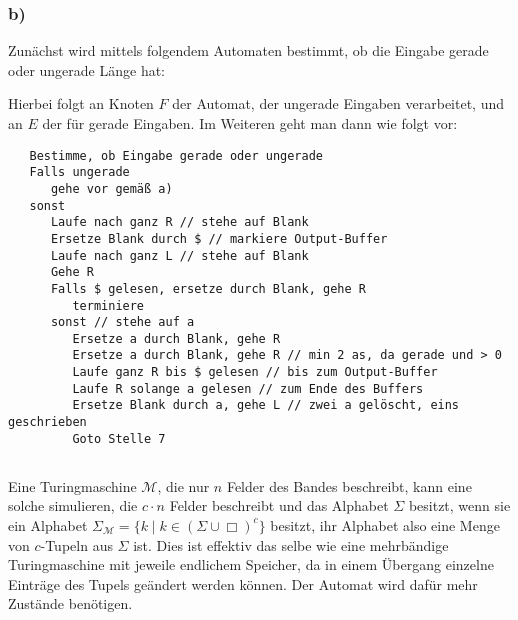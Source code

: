 \documentclass{article}
\begin{document}
\subsubsection{b)}

Zunächst wird mittels folgendem Automaten bestimmt, ob die Eingabe gerade oder
ungerade Länge hat:

\begin{center}
\end{center}

Hierbei folgt an Knoten $F$ der Automat, der ungerade Eingaben verarbeitet, und
an $E$ der für gerade Eingaben. Im Weiteren geht man dann wie folgt vor:

\begin{lstlisting}
   Bestimme, ob Eingabe gerade oder ungerade
   Falls ungerade
      gehe vor gemäß a)
   sonst
      Laufe nach ganz R // stehe auf Blank
      Ersetze Blank durch $ // markiere Output-Buffer
      Laufe nach ganz L // stehe auf Blank
      Gehe R
      Falls $ gelesen, ersetze durch Blank, gehe R
         terminiere
      sonst // stehe auf a
         Ersetze a durch Blank, gehe R
         Ersetze a durch Blank, gehe R // min 2 as, da gerade und > 0
         Laufe ganz R bis $ gelesen // bis zum Output-Buffer
         Laufe R solange a gelesen // zum Ende des Buffers
         Ersetze Blank durch a, gehe L // zwei a gelöscht, eins geschrieben
         Goto Stelle 7
\end{lstlisting}

\subsection{} 

Eine Turingmaschine $\mathcal{M}$, die nur $n$ Felder des Bandes beschreibt, kann eine solche
simulieren, die $c\cdot n$ Felder beschreibt und das Alphabet $\Sigma$ besitzt,
wenn sie ein Alphabet $\Sigma_\mathcal{M} = \{k \mid k \in \left(\Sigma \cup
\Box\right)^c\}$ besitzt,
ihr Alphabet also eine Menge von $c$-Tupeln aus $\Sigma$ ist. Dies ist effektiv
das selbe wie eine mehrbändige Turingmaschine mit jeweile endlichem Speicher, da
in einem Übergang einzelne Einträge des Tupels geändert werden können. Der
Automat wird dafür mehr Zustände benötigen.
\end{document}
